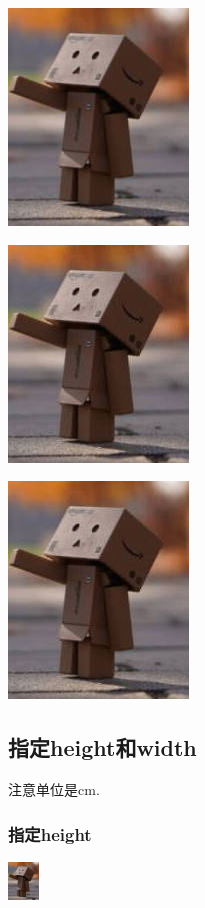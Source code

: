 \documentclass{article}
\begin{document}
	\includegraphics[angle=180]{test.jpg}
	
	\includegraphics[angle=-90]{test.jpg}
	
	\includegraphics[angle=-180]{test.jpg}
	
	\subsection{指定height和width}
	注意单位是cm.
	\subsubsection{指定height}
	
	\includegraphics[height=1cm]{test.jpg}
	
\end{document}
